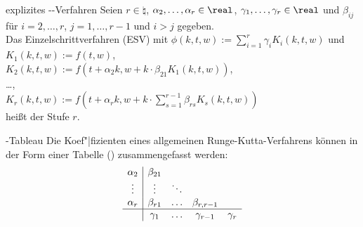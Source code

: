\linie

\begin{Def}{explizites --Verfahren}
    Seien $r \in \natural$, $\alpha_2, \dotsc, \alpha_r \in \real$,
    $\gamma_1, \dotsc, \gamma_r \in \real$ und
    $\beta_{ij}$ für $i = 2, \dotsc, r$, $j = 1, \dotsc, r - 1$ und $i > j$
    gegeben.\\
    Das Einzelschrittverfahren (ESV) mit
    $\phi(k, t, w) := \sum_{i=1}^r \gamma_i K_i(k, t, w)$ und\\
    $K_1(k, t, w) := f(t, w)$,\\
    $K_2(k, t, w) := f(t + \alpha_2 k, w + k \cdot \beta_{21} K_1(k, t, w))$,\\
    \dots,\\
    $K_r(k, t, w) := f(t + \alpha_r k,
    w + k \cdot \sum_{s=1}^{r-1} \beta_{rs} K_s(k, t, w))$\\
    heißt 
    der Stufe $r$.
\end{Def}

\begin{Def}{-Tableau}
    Die Koef"|fizienten eines allgemeinen Runge-Kutta-Verfahrens können in
    der Form einer Tabelle () zusammengefasst
    werden:
    \begin{align*}
        \begin{array}{c|cccc}
            \alpha_2 & \beta_{21}\\
            \vdots & \vdots & \ddots\\
            \alpha_r & \beta_{r1} & \hdots & \beta_{r,r-1}\\\hline
            & \gamma_1 & \hdots & \gamma_{r-1} & \gamma_r
        \end{array}
    \end{align*}
\end{Def}

\linie

